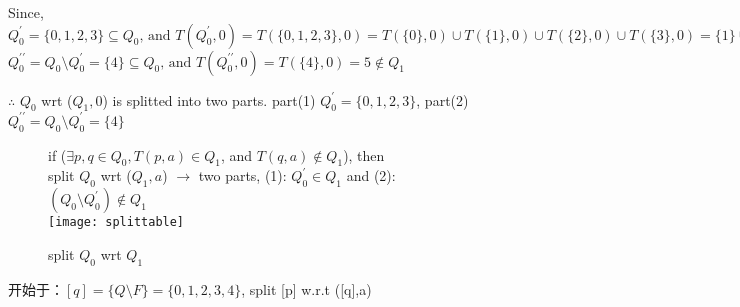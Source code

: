 Since, $Q_0^{\prime}=\{0,1,2,3\}\subseteq Q_0\text{, and }T(Q_0^{\prime},0) = T(\{0,1,2,3\},0)=T(\{0\},0)\cup T(\{1\},0)\cup T(\{2\},0)\cup T(\{3\},0) = \{1\} \cup \{2\} \cup \{3\} =\{1,2,3\}\in Q_1$ \\
$Q_0^{\prime\prime}=Q_0\setminus Q_0^\prime=\{4\}\subseteq Q_0\text{, and }T(Q_0^{\prime\prime},0) = T(\{4\},0)= {5}\notin Q_1$ 

$\therefore$
$Q_0$ wrt ($Q_1,0$) is splitted into two parts. part(1) $Q_0^\prime=\{0,1,2,3\}$, part(2) $Q_0^{\prime\prime}=Q_0\setminus Q_0^\prime=\{4\}$

\begin{figure}[htbp]
	if ($\exists p,q\in Q_0,T(p,a)\in Q_1$, and  $T(q,a)\notin Q_1$), then \\
	split $Q_0$ wrt ($Q_1,a$) $\to$ two parts, (1): $Q_0^\prime\in Q_1$ and (2):
	 $(Q_0\setminus Q_0^\prime)\notin Q_1$ \\
	\texttt{[image: splittable]}
	\caption{split $Q_0$ wrt $Q_1$ }
	\label{fig:split}
\end{figure}


开始于：$[q]=\{Q\setminus F\} = \{0,1,2,3,4\}$, split [p] w.r.t ([q],a)

